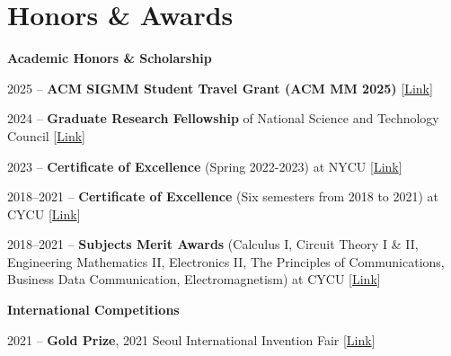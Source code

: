 \section{\textbf{Honors \& Awards}}

\vspace{1mm}
\noindent \textbf{\large Academic Honors \& Scholarship}
\vspace{-2.5mm}

\resumeItemListStart
    \item{
        2025 -- \textbf{ACM SIGMM Student Travel Grant (ACM MM 2025)}
        {\color{Blue}[\href{https://records.sigmm.org/2026/02/02/reports-from-acm-multimedia-2025/}{Link}]}
    }
    \item{
        2024 -- \textbf{Graduate Research Fellowship} of National Science and Technology Council
        {\color{Blue}[\href{https://leohuang0511.github.io/assets/certificates/academic/2024_Graduate_Research_Fellowship.pdf}{Link}]}
    }
    \item{
        2023 -- \textbf{Certificate of Excellence} (Spring 2022-2023) at NYCU
        {\color{Blue}[\href{https://leohuang0511.github.io/assets/certificates/academic/NYCU_Certificate_of_Excellence.pdf}{Link}]}
    }
    \item{
        2018--2021 -- \textbf{Certificate of Excellence} (Six semesters from 2018 to 2021) at CYCU
        {\color{Blue}[\href{https://leohuang0511.github.io/assets/certificates/academic/CYCU_Certificate_of_Excellence.pdf}{Link}]}
    }
    \item{
        2018--2021 -- \textbf{Subjects Merit Awards} (Calculus I, Circuit Theory I \& II, Engineering Mathematics II, Electronics II, The Principles of Communications, Business Data Communication, Electromagnetism) at CYCU
        {\color{Blue}[\href{https://leohuang0511.github.io/assets/certificates/academic/CYCU_subject_merit_award.pdf}{Link}]}
    }
 
 \resumeItemListEnd

\vspace{0.5mm}
\noindent \textbf{\large International Competitions}
\vspace{-2.5mm}

\resumeItemListStart
    \item{
        2021 -- \textbf{Gold Prize}, 2021 Seoul International Invention Fair
        {\color{Blue}[\href{https://leohuang0511.github.io/assets/certificates/international/Seoul_International_Invention_Fair.pdf}{Link}]}
    }


